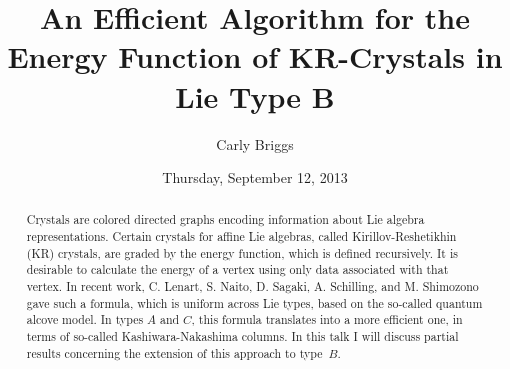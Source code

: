 \documentclass{UAmathtalk}
\author{Carly Briggs}
\title{An Efficient Algorithm for the Energy Function of KR-Crystals in Lie Type B}
\date{Thursday, September 12, 2013}
\begin{document}
\maketitle

\begin{abstract}
Crystals are colored directed graphs encoding information about Lie algebra representations. Certain crystals for affine Lie algebras, called Kirillov-Reshetikhin (KR) crystals, are graded by the energy function, which is defined recursively. It is desirable to calculate the energy of a vertex using only data associated with that vertex.  In recent work, C. Lenart, S. Naito, D. Sagaki, A. Schilling, and M. Shimozono gave such a formula, which is uniform across Lie types, based on the so-called quantum alcove model.  In types $A$ and $C$, this formula translates into a more efficient one, in terms of so-called Kashiwara-Nakashima columns. In this talk I will discuss partial results concerning the extension of this approach to type~$B$.
\end{abstract}
\end{document}
